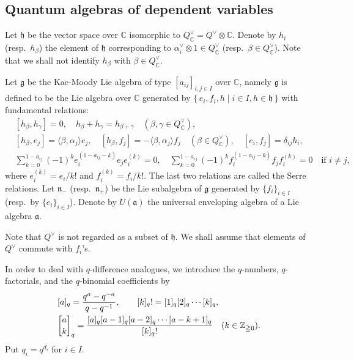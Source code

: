 \documentclass[12pt,twoside]{article}
\newcommand\bra{\langle}
\newcommand\ket{\rangle}
\newcommand\av{\alpha^\vee}
\newcommand\Qv{Q^\vee}
\newcommand\g{{\mathfrak g}}
\newcommand\h{{\mathfrak h}}
\newcommand\n{{\mathfrak n}}
\newcommand\Z{{\mathbb Z}} %
\newcommand\C{{\mathbb C}} %
\theoremstyle{plain} %
\theoremstyle{definition} %
\theoremstyle{definition} %
\numberwithin{theorem}{section}
\numberwithin{equation}{section}
\numberwithin{figure}{section}
\numberwithin{table}{section}
\begin{document}

\subsection{Quantum algebras of dependent variables}
\label{sec:A}

Let $\h$ be the vector space over $\C$ isomorphic to $\Qv_\C=\Qv\otimes\C$.
Denote by $h_i$ (resp.\ $h_\beta$) 
the element of $\h$ corresponding to $\av_i\otimes1\in\Qv_\C$
(resp.\ $\beta\in\Qv_\C$).
Note that we shall not identify $h_\beta$ with $\beta\in\Qv_\C$.

Let $\g$ be the Kac-Moody Lie algebra of type $[a_{ij}]_{i,j\in I}$ 
over $\C$, namely $\g$ is defined to be the Lie algebra over $\C$ 
generated by $\{\,e_i,f_i,h\mid i\in I, h\in\h \,\}$ with fundamental relations:
\begin{align*}
 &
 [h_\beta,h_\gamma] = 0, \quad h_\beta+h_\gamma=h_{\beta+\gamma} 
 \quad (\beta,\gamma\in\Qv_\C), 
 \\ &
 [h_\beta, e_j] =  \bra\beta,\alpha_j\ket e_j, \quad
 [h_\beta, f_j] = -\bra\beta,\alpha_j\ket f_j \quad (\beta\in\Qv_\C), \quad
 [e_i,f_j] = \delta_{ij}h_i,
 \\ &
 \sum_{k=0}^{1-a_{ij}} 
 (-1)^k e_i^{(1-a_{ij}-k)}e_je_i^{(k)} = 0,
 \quad
 \sum_{k=0}^{1-a_{ij}} 
 (-1)^k f_i^{(1-a_{ij}-k)}f_jf_i^{(k)} = 0
 \quad\text{if $i\ne j$},
\end{align*}
where $e_i^{(k)}=e_i/k!$ and $f_i^{(k)}=f_i/k!$.
The last two relations are called the Serre relations.
Let $\n_-$ (resp.\ $\n_+$) be 
the Lie subalgebra of $\g$ generated by $\{f_i\}_{i\in I}$
(resp.\ by $\{e_i\}_{i\in I}$).
Denote by $U(\mathfrak{a})$ the universal enveloping algebra of a Lie 
algebra $\mathfrak{a}$.

Note that $\Qv$ is not regarded as a subset of $\h$.
We shall assume that elements of $\Qv$ commute with $f_i$'s.

In order to deal with $q$-difference analogues, 
we introduce the $q$-numbers, $q$-factorials, and 
the $q$-binomial coefficients by
\begin{align*}
 &
 [a]_q = \frac{q^a-q^{-a}}{q-q^{-1}}, \qquad
 [k]_q! = [1]_q[2]_q\cdots[k]_q, \quad
 \\ &
 \qbinom{a}{k}_q =
 \frac{[a]_q[a-1]_q[a-2]_q\cdots[a-k+1]_q}{[k]_q!}
 \quad  (k\in\Z_{\geqq0}).
\end{align*}
Put $q_i = q^{d_i}$ for $i\in I$.
\end{document}
